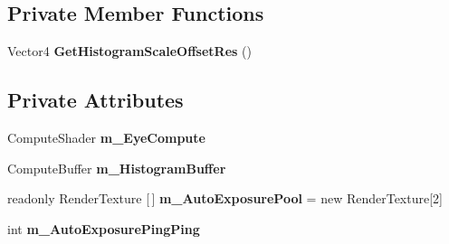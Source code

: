 \subsection*{Private Member Functions}
\begin{DoxyCompactItemize}
\item 
\mbox{\label{class_unity_engine_1_1_post_processing_1_1_eye_adaptation_component_ab2514a2caec3015f80965a7bf2bf0794}} 
Vector4 {\bfseries Get\+Histogram\+Scale\+Offset\+Res} ()
\end{DoxyCompactItemize}
\subsection*{Private Attributes}
\begin{DoxyCompactItemize}
\item 
\mbox{\label{class_unity_engine_1_1_post_processing_1_1_eye_adaptation_component_a098d4b83df452a696ce538455991491e}} 
Compute\+Shader {\bfseries m\+\_\+\+Eye\+Compute}
\item 
\mbox{\label{class_unity_engine_1_1_post_processing_1_1_eye_adaptation_component_aeb3658f74237024d1f0c63b64b6f4731}} 
Compute\+Buffer {\bfseries m\+\_\+\+Histogram\+Buffer}
\item 
\mbox{\label{class_unity_engine_1_1_post_processing_1_1_eye_adaptation_component_a04792ae5a0aa1bdd7623beb6fc4eb362}} 
readonly Render\+Texture \mbox{[}$\,$\mbox{]} {\bfseries m\+\_\+\+Auto\+Exposure\+Pool} = new Render\+Texture\mbox{[}2\mbox{]}
\item 
\mbox{\label{class_unity_engine_1_1_post_processing_1_1_eye_adaptation_component_aa1c503a8338c7fbf3b1b24dfb1aeb02b}} 
int {\bfseries m\+\_\+\+Auto\+Exposure\+Ping\+Ping}
\item 
\mbox{\label{class_unity_engine_1_1_post_processing_1_1_eye_adaptation_component_a204527bcd277a6306c49cd93d2c2b502}} 

\end{DoxyCompactItemize}
